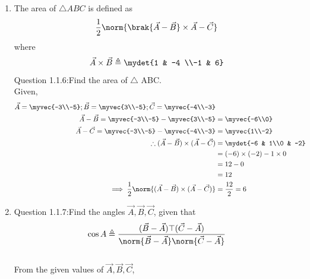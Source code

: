 \documentclass[11pt]{book}
\begin{document}
\begin{enumerate}[label=\thesection.\arabic*.,ref=\thesection.\theenumi]
\item The area of $\triangle ABC$ is defined as
		\begin{align}
			\frac{1}{2}\norm{{\brak{\vec{A}-\vec{B}}\times {\vec{A}-\vec{C}}}}
		\end{align}
		where
		\begin{align}
			\vec{A}\times\vec{B} \triangleq \mydet{1 & -4 \\-1 & 6}
		\end{align}
Question 1.1.6:Find the area of $\triangle$ ABC.\\
\solution
Given,
\begin{align}
\vec{A} = \myvec{-3\\-5};
\vec{B} = \myvec{3\\-5};
\vec{C} = \myvec{-4\\-3}\\
\vec{A}-\vec{B}=\myvec{-3\\-5}-\myvec{3\\-5}&=\myvec{-6\\0}\\
\vec{A}-\vec{C}=\myvec{-3\\-5}-\myvec{-4\\-3}&=\myvec{1\\-2}\\
\therefore(\vec{A}-\vec{B})\times(\vec{A}-\vec{C}) &=\mydet{-6 & 1\\0 & -2}\\
	&=(-6)\times (-2)- 1\times0\\&=12-0\\&=12\\
\implies\frac{1}{2}\norm{(\vec{A}-\vec{B})\times(\vec{A}-\vec{C})}&=\frac{12}{2}=6
\end{align}


\item
Question 1.1.7:Find the angles $\vec{A},\vec{B},\vec{C}$, given that 
\begin{align}
	\cos{A} \triangleq \frac{(\vec{B}-\vec{A})\top(\vec{C}-\vec{A})}{\norm{\vec{B}-\vec{A}}\norm{\vec{C}-\vec{A}}}
\end{align}
\solution 
\\
From the given values of $\vec{A},\vec{B},\vec{C}$,\\
\begin{enumerate}


\end{enumerate}
\end{enumerate}
\end{document}
